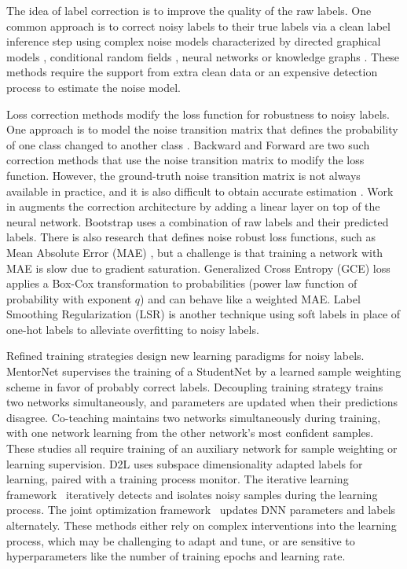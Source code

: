 \documentclass[10pt,twocolumn,letterpaper]{article}
\begin{document}
The idea of label correction is to improve the quality of the raw labels. One common approach is to correct noisy labels to their true labels via a clean label inference step using complex noise models characterized by directed graphical models \cite{xiao2015learning}, conditional random fields \cite{vahdat2017toward}, neural networks \cite{lee2017cleannet,veit2017learning} or knowledge graphs \cite{li2017learning}. These methods require the support from extra clean data or an expensive detection process to estimate the noise model. 


Loss correction methods modify the loss function for robustness to noisy labels. One approach is to model the noise transition matrix that defines the probability of one class changed to another class \cite{han2018masking}. Backward \cite{patrini2017making} and Forward \cite{patrini2017making} are two such correction methods that use the noise transition matrix to modify the loss function. However, the ground-truth noise transition matrix is not always available in practice, and it is also difficult to obtain accurate estimation \cite{han2018masking}. Work in \cite{goldberger2016training,sukhbaatar2014training} augments the correction architecture by adding a linear layer on top of the neural network. Bootstrap \cite{reed2014training}  uses a combination of raw labels and their predicted labels. There is also research that defines noise robust loss functions, such as Mean Absolute Error (MAE) \cite{ghosh2017robust}, but a challenge is that training a network with MAE is slow due to gradient saturation.    Generalized Cross Entropy (GCE) loss \cite{zhang2018generalized} applies a Box-Cox transformation to probabilities (power law function of probability with exponent $q$) and can behave like a weighted MAE. Label Smoothing Regularization (LSR) \cite{szegedy2016rethinking,pereyra2017regularizing} is another technique using soft labels in place of one-hot labels to alleviate overfitting to noisy labels. 


Refined training strategies design new learning paradigms for noisy labels. MentorNet \cite{jiang2018mentornet,yu2019does} supervises the training of a StudentNet by a learned sample weighting scheme in favor of probably correct labels. Decoupling training strategy \cite{malach2017decoupling} trains two networks simultaneously, and parameters are updated when their predictions disagree. Co-teaching \cite{han2018co} maintains two networks simultaneously during training, with one network learning from the other network's most confident samples. These studies all require training of an auxiliary network for sample weighting or learning supervision. D2L \cite{ma2018dimensionality} uses subspace dimensionality adapted labels for learning, paired with a training process monitor. The iterative learning framework~\cite{wang2018iterative} iteratively detects and isolates noisy samples during the learning process. The joint optimization framework~\cite{tanaka2018joint} updates DNN parameters and labels alternately. These methods either rely on complex interventions into the learning process, which may be challenging to adapt and tune, or are sensitive to hyperparameters like the number of training epochs and learning rate.
\end{document}
